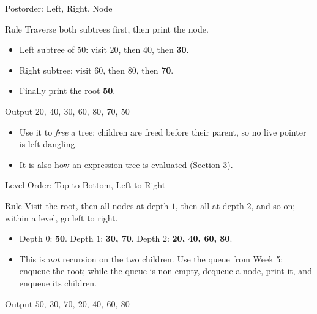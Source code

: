 \documentclass[aspectratio=169]{beamer}
\begin{document}
\begin{frame}{Postorder: Left, Right, Node}
  \begin{block}{Rule}
    Traverse both subtrees first, then print the node.
  \end{block}
  \begin{itemize}
    \item Left subtree of 50: visit 20, then 40, then \textbf{30}.
    \item Right subtree: visit 60, then 80, then \textbf{70}.
    \item Finally print the root \textbf{50}.
  \end{itemize}
  \begin{exampleblock}{Output}
    $20,\ 40,\ 30,\ 60,\ 80,\ 70,\ 50$
  \end{exampleblock}
  \begin{itemize}
    \item Use it to \emph{free} a tree: children are freed before their
      parent, so no live pointer is left dangling.
    \item It is also how an expression tree is evaluated (Section 3).
  \end{itemize}
\end{frame}

\begin{frame}{Level Order: Top to Bottom, Left to Right}
  \begin{block}{Rule}
    Visit the root, then all nodes at depth $1$, then all at depth $2$, and
    so on; within a level, go left to right.
  \end{block}
  \begin{itemize}
    \item Depth $0$: \textbf{50}. Depth $1$: \textbf{30, 70}.
      Depth $2$: \textbf{20, 40, 60, 80}.
    \item This is \emph{not} recursion on the two children. Use the queue
      from Week 5: enqueue the root; while the queue is non-empty, dequeue a
      node, print it, and enqueue its children.
  \end{itemize}
  \begin{exampleblock}{Output}
    $50,\ 30,\ 70,\ 20,\ 40,\ 60,\ 80$
  \end{exampleblock}
\end{frame}
\end{document}
